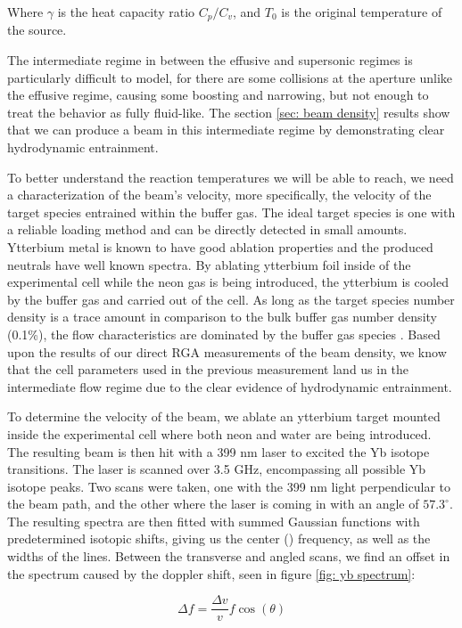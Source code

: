 Where $\gamma$ is the heat capacity ratio $C_p/C_v$, and $T_0$ is the original temperature of the source.

The intermediate regime in between the effusive and supersonic regimes is particularly difficult to model, for there are some collisions at the aperture unlike the effusive regime, causing some boosting and narrowing, but not enough to treat the behavior as fully fluid-like. The section \ref{sec: beam density} results show that we can produce a beam in this intermediate regime by demonstrating clear hydrodynamic entrainment.

To better understand the reaction temperatures we will be able to reach, we need a characterization of the beam's velocity, more specifically, the velocity of the target species entrained within the buffer gas. The ideal target species is one with a reliable loading method and can be directly detected in small amounts. Ytterbium metal is known to have good ablation properties and the produced neutrals have well known spectra. By ablating ytterbium foil inside of the experimental cell while the neon gas is being introduced, the ytterbium is cooled by the buffer gas and carried out of the cell. As long as the target species number density is a trace amount in comparison to the bulk buffer gas number density (0.1\%), the flow characteristics are dominated by the buffer gas species \cite{Hutzler2012}. Based upon the results of our direct RGA measurements of the beam density, we know that the cell parameters used in the previous measurement land us in the intermediate flow regime due to the clear evidence of hydrodynamic entrainment.

To determine the velocity of the beam, we ablate an ytterbium target mounted inside the experimental cell where both neon and water are being introduced. The resulting beam is then hit with a 399 nm laser to excited the Yb isotope transitions. The laser is scanned over 3.5 GHz, encompassing all possible Yb isotope peaks. Two scans were taken, one with the 399 nm light perpendicular to the beam path, and the other where the laser is coming in with an angle of $57.3^\circ$. The resulting spectra are then fitted with summed Gaussian functions with predetermined isotopic shifts, giving us the center () frequency, as well as the widths of the lines. Between the transverse and angled scans, we find an offset in the spectrum caused by the doppler shift, seen in figure \ref{fig: yb spectrum}:

\begin{equation}
	\Delta f = \frac{\Delta v}{v} f \cos(\theta)
	\label{eq: doppler}
\end{equation}

